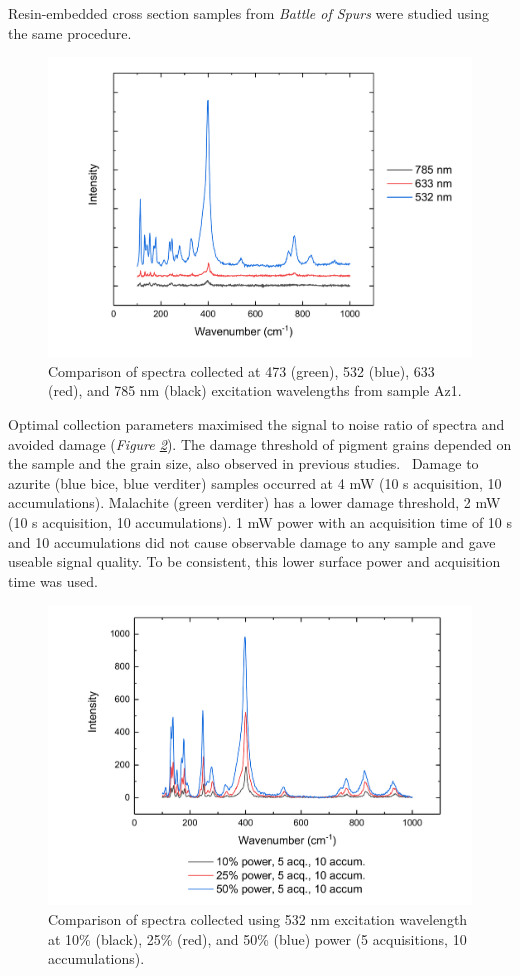 Resin-embedded cross section samples from \textit{Battle of Spurs} were studied using the same procedure.

\begin{figure}[H]
\centering
  \includegraphics[width=0.75\linewidth]{Az1_wavelength_comparison}
\caption[Comparison of spectra collected at 473, 532, 633, and 785 nm excitation wavelengths from sample Az1.]{Comparison of spectra collected at 473 (green), 532 (blue), 633 (red), and 785 nm (black) excitation wavelengths from sample Az1.}
\label{fig:Az1_wavelength_comparison}
\end{figure}

Optimal collection parameters maximised the signal to noise ratio of spectra and avoided damage (\textit{Figure \ref{fig:Az1_laserpower_comp_532}}). The damage threshold of pigment grains depended on the sample and the grain size, also observed in previous studies.~\autocite{Cardell,Mattei} Damage to azurite (blue bice, blue verditer) samples occurred at 4 mW (10 s acquisition, 10 accumulations). Malachite (green verditer) has a lower damage threshold, 2 mW (10 s acquisition, 10 accumulations). 1 mW power with an acquisition time of 10 s and 10 accumulations did not cause observable damage to any sample and gave useable signal quality. To be consistent, this lower surface power and acquisition time was used. 

\begin{figure}[H]
\centering
  \includegraphics[width=0.75\linewidth]{Az1_laserpower_comp_532}
\caption[Comparison of spectra collected using 532 nm excitation wavelength at 10\%, 25\%, and 50\% power.]{Comparison of spectra collected using 532 nm excitation wavelength at 10\% (black), 25\% (red), and 50\% (blue) power (5 acquisitions, 10 accumulations).}
\label{fig:Az1_laserpower_comp_532}
\end{figure}

